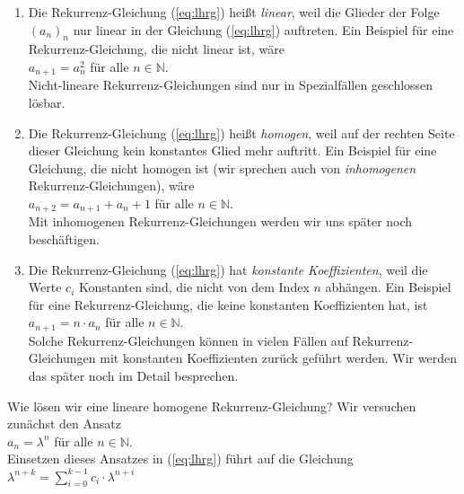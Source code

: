 \begin{enumerate}
\item Die Rekurrenz-Gleichung (\ref{eq:lhrg}) hei{\ss}t \emph{linear}, weil die Glieder der Folge $(a_n)_n$ nur
      linear in der Gleichung (\ref{eq:lhrg}) auftreten.  Ein Beispiel f\"ur eine
      Rekurrenz-Gleichung, die nicht linear ist, w\"are \\[0.1cm]
      \hspace*{1.3cm} $a_{n+1} = a_n^2$ \quad f\"ur alle $n \in \mathbb{N}$. \\[0.1cm]
      Nicht-lineare Rekurrenz-Gleichungen sind nur in Spezialf\"allen geschlossen l\"osbar.
\item Die Rekurrenz-Gleichung (\ref{eq:lhrg}) hei{\ss}t \emph{homogen}, weil auf der rechten Seite
      dieser Gleichung kein konstantes Glied mehr auftritt.  Ein Beispiel f\"ur eine
      Gleichung, die nicht homogen ist (wir sprechen auch von \emph{inhomogenen}
      Rekurrenz-Gleichungen), w\"are \\[0.1cm]
      \hspace*{1.3cm} $a_{n+2} = a_{n+1} + a_n + 1$ \quad f\"ur alle $n \in \mathbb{N}$. \\[0.1cm]
      Mit inhomogenen Rekurrenz-Gleichungen werden wir uns sp\"ater noch besch\"aftigen.
\item Die Rekurrenz-Gleichung (\ref{eq:lhrg}) hat \emph{konstante Koeffizienten}, weil die
      Werte $c_i$ Konstanten sind, die nicht von dem Index $n$ abh\"angen.  Ein Beispiel f\"ur
      eine Rekurrenz-Gleichung, die keine konstanten Koeffizienten hat, ist \\[0.1cm]
      \hspace*{1.3cm} $a_{n+1} = n\cdot a_n$ \quad f\"ur alle $n \in \mathbb{N}$. \\[0.1cm]
      Solche Rekurrenz-Gleichungen k\"onnen in vielen F\"allen auf Rekurrenz-Gleichungen mit
      konstanten Koeffizienten zur\"uck gef\"uhrt werden.  Wir werden das sp\"ater noch im
      Detail besprechen.
\end{enumerate}
Wie l\"osen wir eine lineare homogene Rekurrenz-Gleichung?  Wir versuchen zun\"achst den Ansatz\\[0.1cm]
\hspace*{1.3cm}  $a_n = \lambda^n$ \quad f\"ur alle $n \in \mathbb{N}$. \\[0.1cm]
Einsetzen dieses Ansatzes in (\ref{eq:lhrg}) f\"uhrt auf die Gleichung \\[0.1cm]
\hspace*{1.3cm}
$\lambda^{n+k} = \sum\limits_{i=0}^{k-1} c_i \cdot \lambda^{n+i}$

